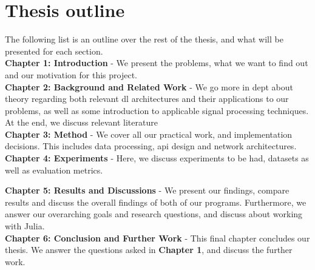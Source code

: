 \section{Thesis outline}

The following list is an outline over the rest of the thesis, and what will be presented for each section. \\

\textbf{Chapter 1: Introduction} - We present the problems, what we want to find out and our motivation for this project. \\

\textbf{Chapter 2: Background and Related Work} - We go more in dept about theory regarding both relevant \acrshort{dl} architectures and their applications to our problems, as well as some introduction to applicable signal processing techniques. At the end, we discuss relevant literature  \\

\textbf{Chapter 3: Method} - We cover all our practical work, and implementation decisions. This includes data processing, \acrshort{api} design and network architectures. \\


\textbf{Chapter 4: Experiments} - Here, we discuss experiments to be had, datasets as well as evaluation metrics. 

\textbf{Chapter 5: Results and Discussions} - We present our findings, compare results and discuss the overall findings of both of our programs. Furthermore, we answer our overarching goals and research questions, and discuss about working with Julia. \\

\textbf{Chapter 6: Conclusion and Further Work} - This final chapter concludes our thesis. We answer the questions asked in \textbf{Chapter 1}, and discuss the further work. \\

